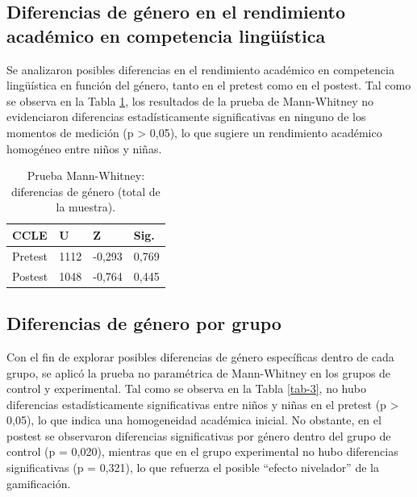 \documentclass[spanish]{textolivre}
\begin{document}
\subsection{Diferencias de género en el rendimiento académico en competencia lingüística}
Se analizaron posibles diferencias en el rendimiento académico en competencia lingüística en función del género, tanto en el pretest como en el postest. Tal como se observa en la Tabla \ref{tab-2}, los resultados de la prueba de Mann-Whitney no evidenciaron diferencias estadísticamente significativas en ninguno de los momentos de medición (p > 0,05), lo que sugiere un rendimiento académico homogéneo entre niños y niñas.

\begin{table}[htbp]
\centering
\begin{threeparttable}
\caption{Prueba Mann-Whitney: diferencias de género (total de la muestra).}\label{tab-2}
\begin{tabular}{p{3cm}p{2cm}p{2cm}p{2cm}}
\toprule
CCLE & U & Z & Sig. \\
\midrule
Pretest & 1112 & -0,293 & 0,769 \\
Postest & 1048 & -0,764 & 0,445 \\
\bottomrule
\end{tabular}
\end{threeparttable}
\end{table}

\subsection{Diferencias de género por grupo}
Con el fin de explorar posibles diferencias de género específicas dentro de cada grupo, se aplicó la prueba no paramétrica de Mann-Whitney en los grupos de control y experimental. Tal como se observa en la Tabla \ref{tab-3}, no hubo diferencias estadísticamente significativas entre niños y niñas en el pretest (p > 0,05), lo que indica una homogeneidad académica inicial. No obstante, en el postest se observaron diferencias significativas por género dentro del grupo de control (p = 0,020), mientras que en el grupo experimental no hubo diferencias significativas (p = 0,321), lo que refuerza el posible ``efecto nivelador'' de la gamificación.
\end{document}
